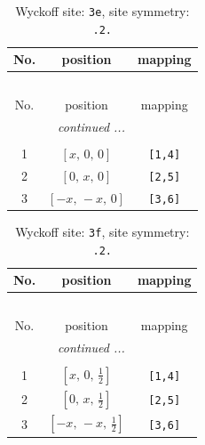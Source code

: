 \documentclass[fleqn,8pt]{jsarticle}
\begin{document}
\begin{longtable}{ccc}
\caption{Wyckoff site: {\tt 3e}, site symmetry: {\tt .2.}}
 \\
 \hline \hline
No. & position & mapping \\ \hline \endfirsthead

\multicolumn{2}{l}{\tablename\ \thetable{}} \\
 \hline \hline
No. & position & mapping \\ \hline \endhead

 \hline \hline
\multicolumn{2}{r}{\footnotesize\it continued ...} \\ \endfoot

 \hline \hline
\multicolumn{2}{r}{} \\ \endlastfoot

1 & $\left[ x,\, 0,\, 0 \right]$ & {\tt [1,4]} \\ \hline
2 & $\left[ 0,\, x,\, 0 \right]$ & {\tt [2,5]} \\ \hline
3 & $\left[ - x,\, - x,\, 0 \right]$ & {\tt [3,6]} \\
\end{longtable}
\renewcommand{\arraystretch}{1.2}
\begin{longtable}{ccc}
\caption{Wyckoff site: {\tt 3f}, site symmetry: {\tt .2.}}
 \\
 \hline \hline
No. & position & mapping \\ \hline \endfirsthead

\multicolumn{2}{l}{\tablename\ \thetable{}} \\
 \hline \hline
No. & position & mapping \\ \hline \endhead

 \hline \hline
\multicolumn{2}{r}{\footnotesize\it continued ...} \\ \endfoot

 \hline \hline
\multicolumn{2}{r}{} \\ \endlastfoot

1 & $\left[ x,\, 0,\, \frac{1}{2} \right]$ & {\tt [1,4]} \\ \hline
2 & $\left[ 0,\, x,\, \frac{1}{2} \right]$ & {\tt [2,5]} \\ \hline
3 & $\left[ - x,\, - x,\, \frac{1}{2} \right]$ & {\tt [3,6]} \\
\end{longtable}
\renewcommand{\arraystretch}{1.2}
\end{document}
